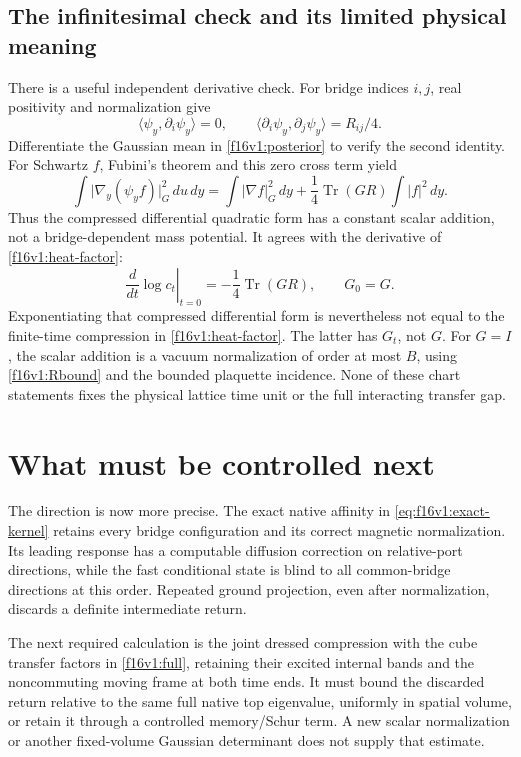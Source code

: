 \documentclass[11pt,oneside]{article}
\DeclareMathOperator{\Tr}{Tr}
\begin{document}
\subsection{The infinitesimal check and its limited physical meaning}

There is a useful independent derivative check.
For bridge indices \(i,j\), real positivity and normalization give
\[
 \langle\psi_y,\partial_i\psi_y\rangle=0,\qquad
 \langle\partial_i\psi_y,\partial_j\psi_y\rangle=R_{ij}/4.
\]
Differentiate the Gaussian mean in
\eqref{f16v1:posterior} to verify the second identity.
For Schwartz \(f\), Fubini's theorem and this zero cross term yield
\begin{equation}
 \int \bigl|\nabla_y(\psi_y f)\bigr|_G^2\,du\,dy
  =\int|\nabla f|_G^2\,dy
                     +\frac14\Tr(GR)\int|f|^2\,dy .
 \label{f16v1:metric}
\end{equation}
Thus the compressed differential quadratic form has a constant
scalar addition, not a bridge-dependent mass potential.
It agrees with the derivative of \eqref{f16v1:heat-factor}:
\[
       \left.\frac d{dt}\log c_t\right|_{t=0}
                           =-\frac14\Tr(GR),\qquad G_0=G.
\]
Exponentiating that compressed differential form is nevertheless
not equal to the finite-time compression in
\eqref{f16v1:heat-factor}. The latter has \(G_t\), not \(G\).
For \(G=I\), the scalar addition is a vacuum normalization of
order at most \(B\), using \eqref{f16v1:Rbound} and the bounded
plaquette incidence. None of these chart statements fixes the
physical lattice time unit or the full interacting transfer gap.

\section{What must be controlled next}
\label{f16v1:next}

The direction is now more precise. The exact native affinity
in \eqref{eq:f16v1:exact-kernel} retains every bridge configuration
and its correct magnetic normalization. Its leading response
has a computable diffusion correction on relative-port directions,
while the fast conditional state is blind to all common-bridge
directions at this order. Repeated ground projection, even after
normalization, discards a definite intermediate return.

The next required calculation is the joint dressed compression
with the cube transfer factors in \eqref{f16v1:full}, retaining
their excited internal bands and the noncommuting moving frame
at both time ends. It must bound the discarded return relative
to the same full native top eigenvalue, uniformly in spatial
volume, or retain it through a controlled memory/Schur term.
A new scalar normalization or another fixed-volume Gaussian
determinant does not supply that estimate.
\end{document}
